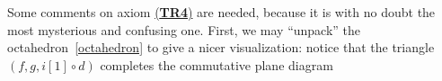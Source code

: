 \begin{rmk}
    Some comments on axiom 
    \hyperref[TR4]{(\textbf{TR4})} are needed,
    because it is with no doubt 
    the most mysterious
    and confusing one.
    First, we may ``unpack'' the octahedron~\eqref{octahedron}
    to give a nicer visualization:
    notice that the triangle $(f,g,i{[1]}\circ d)$
    completes the commutative plane diagram
    \begin{center}
    \end{center}
    

\end{rmk}
